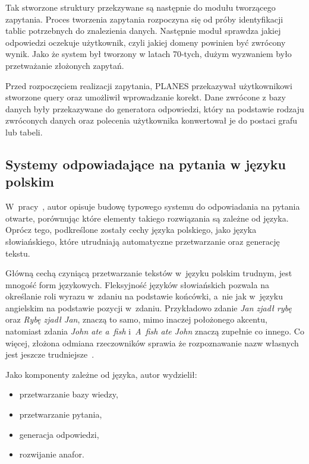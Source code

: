 Tak stworzone struktury przekzywane są następnie do modułu tworzącego zapytania. Proces tworzenia zapytania rozpoczyna się od próby identyfikacji tablic potrzebnych do znalezienia danych. Następnie moduł sprawdza jakiej odpowiedzi oczekuje użytkownik, czyli jakiej domeny powinien być zwrócony wynik. Jako że system był tworzony w latach 70-tych, dużym wyzwaniem było przetważanie złożonych zapytań.

Przed rozpoczęciem realizacji zapytania, PLANES przekazywał użytkownikowi stworzone query oraz umożliwił wprowadzanie korekt. Dane zwrócone z bazy danych były przekazywane do generatora odpowiedzi, który na podstawie rodzaju zwróconych danych oraz polecenia użytkownika konwertował je do postaci grafu lub tabeli\cite{waltz1978english}.

\subsection{Systemy odpowiadające na pytania w języku polskim}\label{subsec:lit:pl}


W~pracy~\cite{przybyla2012issues}, autor opisuje budowę typowego systemu do odpowiadania na pytania otwarte, porównując które elementy takiego rozwiązania są zależne od języka. Oprócz tego, podkreślone zostały cechy języka polskiego, jako języka słowiańskiego, które utrudniają automatyczne przetwarzanie oraz generację tekstu.

Główną cechą czyniącą przetwarzanie tekstów w~języku polskim trudnym, jest mnogość form językowych. Fleksyjność języków słowiańskich pozwala na określanie roli wyrazu w~zdaniu na podstawie końcówki, a~nie jak w~języku angielskim na podstawie pozycji w~zdaniu. Przykładowo zdanie \emph{Jan zjadł rybę} oraz \emph{Rybę zjadł Jan}, znaczą to samo, mimo inaczej położonego akcentu, natomiast zdania \emph{John ate a~fish} i~\emph{A~fish ate John} znaczą zupełnie co innego. Co więcej, złożona odmiana rzeczowników sprawia że rozpoznawanie nazw własnych jest jeszcze trudniejsze~\cite{przybyla2012issues}.

Jako komponenty zależne od języka, autor wydzielił:
\begin{itemize}
	\item przetwarzanie bazy wiedzy,
	\item przetwarzanie pytania,
	\item generacja odpowiedzi,
	\item rozwijanie anafor.
\end{itemize}

